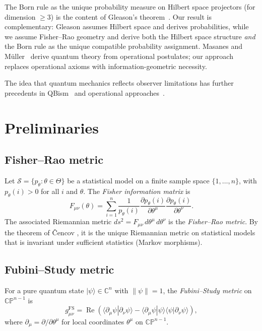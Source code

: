 \documentclass[12pt,a4paper]{article}
\theoremstyle{definition}
\newcommand{\C}{\mathbb{C}}
\newcommand{\CP}{\mathbb{CP}}
\newcommand{\Scal}{\mathcal{S}}
\newcommand{\ip}[2]{\langle #1 | #2 \rangle}
\newcommand{\ket}[1]{| #1 \rangle}
\begin{document}
The Born rule as the unique probability measure on Hilbert space
projectors (for dimension $\geq 3$) is the content of Gleason's
theorem~\cite{Gleason1957}. Our result is complementary: Gleason
assumes Hilbert space and derives probabilities, while we assume
Fisher--Rao geometry and derive both the Hilbert space structure
\emph{and} the Born rule as the unique compatible probability
assignment. Masanes and M\"uller~\cite{MasanesMueller2011} derive
quantum theory from operational postulates; our approach replaces
operational axioms with information-geometric necessity.

The idea that quantum mechanics reflects observer limitations has
further precedents in QBism~\cite{FuchsMerminSchack2014,CavesFuchsSchack2002}
and operational approaches~\cite{Hardy2001,ChiribellaEtAl2011}.

\section{Preliminaries}
\label{sec:prelim}

\subsection{Fisher--Rao metric}

Let $\Scal = \{p_\theta : \theta \in \Theta\}$ be a statistical model
on a finite sample space $\{1, \ldots, n\}$, with $p_\theta(i) > 0$
for all $i$ and $\theta$. The \emph{Fisher information matrix} is
\begin{equation}
  \label{eq:fisher}
  F_{\mu\nu}(\theta)
  = \sum_{i=1}^n \frac{1}{p_\theta(i)}
    \frac{\partial p_\theta(i)}{\partial \theta^\mu}
    \frac{\partial p_\theta(i)}{\partial \theta^\nu}.
\end{equation}
The associated Riemannian metric $ds^2 = F_{\mu\nu}\, d\theta^\mu\,
d\theta^\nu$ is the \emph{Fisher--Rao metric}. By the theorem of
\v{C}encov \cite{Cencov1982}, it is the unique Riemannian metric on
statistical models that is invariant under sufficient statistics
(Markov morphisms).

\subsection{Fubini--Study metric}

For a pure quantum state $\ket{\psi} \in \C^n$ with
$\|\psi\| = 1$, the \emph{Fubini--Study metric} on
$\CP^{n-1}$ is
\begin{equation}
  \label{eq:fubini-study}
  g^{\mathrm{FS}}_{\mu\nu}
  = \operatorname{Re}\!\left(
    \ip{\partial_\mu\psi}{\partial_\nu\psi}
    - \ip{\partial_\mu\psi}{\psi}\ip{\psi}{\partial_\nu\psi}
  \right),
\end{equation}
where $\partial_\mu = \partial/\partial\theta^\mu$ for local
coordinates $\theta^\mu$ on $\CP^{n-1}$.
\end{document}

